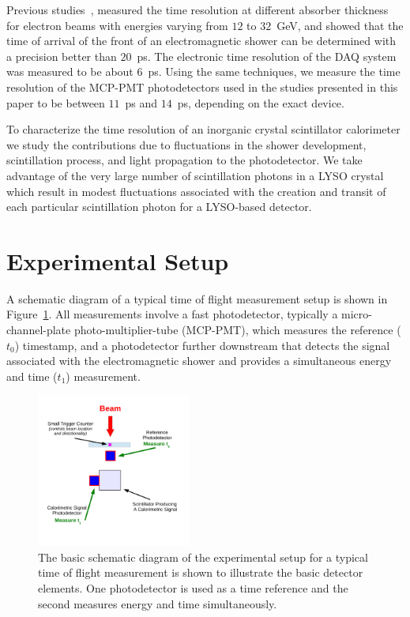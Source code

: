 \documentclass[12pt]{article}
\begin{document}
Previous studies~\cite{MCPFastCaloNIMA}, measured the time resolution at different
absorber thickness for electron beams with energies varying from $12$ to
$32$~GeV, and showed that the time of arrival of the front of an electromagnetic
shower can be determined with a precision better than $20$~ps. The electronic
time resolution of the DAQ system was measured to be about $6$~ps. Using
the same techniques, we measure the time resolution of the MCP-PMT photodetectors 
used in the studies presented in this paper  to be between $11$~ps and $14$~ps, depending 
on the exact device.

To characterize the time resolution of an inorganic crystal scintillator calorimeter we
study the contributions due to fluctuations in the shower development, scintillation process, 
and light propagation to the photodetector.  We take advantage of the very large number of 
scintillation photons in a LYSO crystal which result in modest fluctuations associated with the 
creation and transit of each particular scintillation photon for a LYSO-based detector. 

 

\section{Experimental Setup}

A schematic diagram of a typical time of flight measurement setup is shown in 
Figure~\ref{fig:TypicalSchematicDiagram}. All measurements involve a fast photodetector,  
typically a micro-channel-plate photo-multiplier-tube 
(MCP-PMT), which  measures the reference ($t_{0}$) timestamp, and a photodetector further 
downstream that detects the signal associated with the electromagnetic shower and provides 
a simultaneous energy and time ($t_{1}$) measurement. 

\begin{figure}[H] \centering
\includegraphics[width=0.45\textwidth]{figs/TypicalSchematicDiagram} 
\caption{\small The basic schematic diagram of the experimental setup for
a typical time of flight measurement is shown to illustrate the
basic detector elements. One photodetector is used as a time reference and the second 
measures energy and time simultaneously.} 
\label{fig:TypicalSchematicDiagram}
\end{figure}
\end{document}
